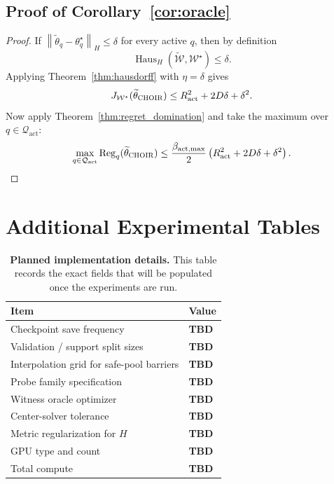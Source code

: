 \documentclass{article}
\newcommand{\cQ}{\mathcal{Q}}
\newcommand{\cW}{\mathcal{W}}
\newcommand{\Reg}{\operatorname{Reg}}
\newcommand{\Haus}{\operatorname{Haus}}
\newcommand{\TBD}{\textbf{TBD}}
\newcommand{\choir}{\textup{\textsc{CHOIR}}}
\newcommand{\norm}[1]{\left\lVert #1 \right\rVert}
\newcommand{\paren}[1]{\left( #1 \right)}
\newcommand{\act}{\mathrm{act}}
\begin{document}
\subsection{Proof of Corollary~\ref{cor:oracle}}

\begin{proof}
If \(\norm{\widetilde\theta_q-\theta_q^\star}_H \le \delta\) for every active \(q\), then by definition
\[
\Haus_H(\widetilde{\cW},\cW^\star)\le \delta.
\]
Applying Theorem~\ref{thm:hausdorff} with \(\eta=\delta\) gives
\[
J_{\cW^\star}(\widetilde\theta_{\choir})
\le
R_\act^2 + 2D\delta + \delta^2.
\]
Now apply Theorem~\ref{thm:regret_domination} and take the maximum over \(q\in\cQ_{\act}\):
\[
\max_{q\in\cQ_{\act}} \Reg_q(\widetilde\theta_{\choir})
\le
\frac{\beta_{\act,\max}}{2}\paren{R_\act^2 + 2D\delta + \delta^2 }.
\]
\end{proof}

\section{Additional Experimental Tables}

\begin{table}[h]
    \centering
    \caption{\textbf{Planned implementation details.} This table records the exact fields that will be populated once the experiments are run.}
    \begin{tabular}{ll}
        \toprule
        Item & Value \\
        \midrule
        Checkpoint save frequency & \TBD{} \\
        Validation / support split sizes & \TBD{} \\
        Interpolation grid for safe-pool barriers & \TBD{} \\
        Probe family specification & \TBD{} \\
        Witness oracle optimizer & \TBD{} \\
        Center-solver tolerance & \TBD{} \\
        Metric regularization for \(H\) & \TBD{} \\
        GPU type and count & \TBD{} \\
        Total compute & \TBD{} \\
        \bottomrule
    \end{tabular}
\end{table}
\end{document}
